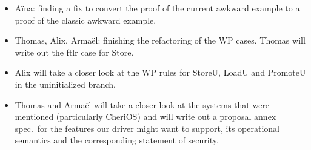 \documentclass{article}
\begin{document}
\begin{itemize}
\item A\"{i}na: finding a fix to convert the proof of the current awkward example to a proof of the classic awkward example.
\item Thomas, Alix, Arma\"el: finishing the refactoring of the WP cases. Thomas will write out the ftlr case for Store.
\item Alix will take a closer look at the WP rules for StoreU, LoadU and PromoteU in the uninitialized branch.
\item Thomas and Arma\"el will take a closer look at the systems that were mentioned (particularly CheriOS) and will write out a proposal annex spec.\ for the features our driver might want to support, its operational semantics and the corresponding statement of security.

\end{itemize}
\end{document}

